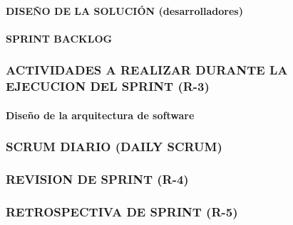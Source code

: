 \begin{doublespace}
\clearpage  %
\paragraph{\Large\textbf {DISEÑO DE LA SOLUCIÓN (desarrolladores)}}


\clearpage %
\paragraph{\Large\textbf {SPRINT BACKLOG}}




\clearpage  %

\subsubsection{ACTIVIDADES A REALIZAR DURANTE LA EJECUCION DEL SPRINT (R-3)}

\paragraph{\Large\textbf {Diseño de la arquitectura de software}}



\clearpage  %
\begin{landscape}

    \subsubsection*{\Large\textbf{SCRUM DIARIO (DAILY SCRUM)}}
    

\end{landscape}



\clearpage  %
\subsubsection{REVISION DE SPRINT (R-4)}






\subsubsection{RETROSPECTIVA DE SPRINT (R-5)}


\end{doublespace}